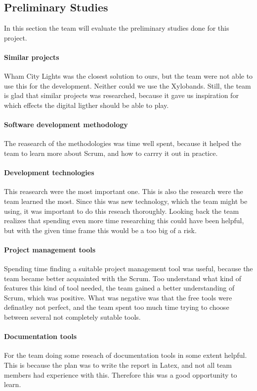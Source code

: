 \subsection{Preliminary Studies}
In this section the team will evaluate the preliminary studies done for this project.
\paragraph{Similar projects} 
Wham City Lights was the closest solution to ours, but the team were not able to use this for the development. Neither could we use the Xylobands. Still, the team is glad that similar projects was researched, because it gave us inspiration for which effects the digital ligther should be able to play.

\paragraph{Software development methodology}
The reasearch of the methodologies was time well spent, because it helped the team to learn more about Scrum, and how to carrry it out in practice.

\paragraph{Development technologies}
This reasearch were the most important one. This is also the research were the team learned the most. Since this was new technology, which the team might be using, it was important to do this reseach thoroughly. Looking back the team realizes that spending even more time researching this could have been helpful, but with the given time frame this would be a too big of a risk. 

\paragraph{Project management tools}
Spending time finding a suitable project management tool was useful, because the team became better acquainted with the Scrum. Too understand what kind of features this kind of tool needed, the team gained a better understanding of Scrum, which was positive. What was negative was that the free tools were definatley not perfect, and the team spent too much time trying to choose between several not completely sutable tools. 

\paragraph{Documentation tools}
For the team doing some reseach of documentation tools in some extent helpful. This is because the plan was to write the report in Latex, and not all team members had experience with this. Therefore this was a good opportunity to learn.

